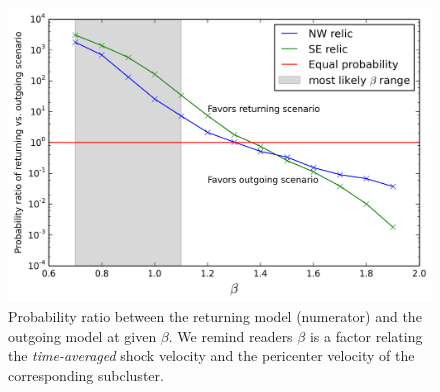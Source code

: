 \documentclass[letterpaper,useAMS,usenatbib]{mn2e}
\begin{document}
\begin{figure}
	\includegraphics[width=\linewidth]{prob_ratio.png}
	\caption{Probability ratio between the returning model (numerator) and
		the outgoing model at given $\beta$. We remind readers $\beta$ is a factor
		relating the {\it time-averaged} shock velocity and the pericenter
		velocity of the corresponding subcluster.  
	\label{fig:prob_ratio}}
\end{figure}
\end{document}
